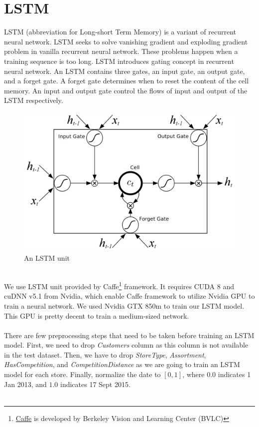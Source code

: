 \section{LSTM}
LSTM (abbreviation for Long-short Term Memory) is a variant of recurrent neural network. LSTM seeks to solve vanishing gradient and exploding gradient problem in vanilla recurrent neural network. These problems happen when a training sequence is too long. LSTM introduces gating concept in recurrent neural network. An LSTM contains three gates, an input gate, an output gate, and a forget gate. A forget gate determines when to reset the content of the cell memory. An input and output gate control the flows of input and output of the LSTM respectively.
\begin{figure}[h]
	\centering
	\includegraphics[width=0.85 \textwidth]{assets/lstm.png}
	\caption{An LSTM unit}
	\label{fig:lstm}
\end{figure} \\
We use LSTM unit provided by Caffe\footnote{\href{https://github.com/BVLC/caffe}{Caffe} is developed by Berkeley Vision and Learning Center (BVLC)} framework. It requires CUDA 8 and cuDNN v5.1 from Nvidia, which enable Caffe framework to utilize Nvidia GPU to train a neural network. We used Nvidia GTX 850m to train our LSTM model. This GPU is pretty decent to train a medium-sized network. \\ \\
There are few preprocessing steps that need to be taken before training an LSTM model. First, we need to drop \textit{Customers} column as this column is not available in the test dataset. Then, we have to drop \textit{StoreType}, \textit{Assortment}, \textit{HasCompetition}, and \textit{CompetitionDistance} as we are going to train an LSTM model for each store. Finally, normalize the date to $[0,1]$, where $0.0$ indicates 1 Jan 2013, and $1.0$ indicates 17 Sept 2015. \\ \\

